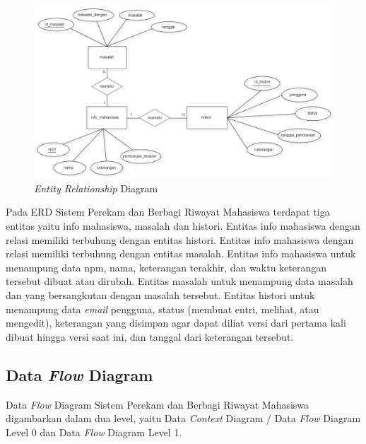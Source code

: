 \begin{figure}[ht]
\centering
\includegraphics[scale=0.4]{Gambar/ERD.png}
\caption[{\it Entity Relationship} Diagram]{{\it Entity Relationship} Diagram} 
\label{fig:erd}
\end{figure}

Pada ERD Sistem Perekam dan Berbagi Riwayat Mahasiswa terdapat tiga entitas yaitu info mahasiswa, masalah dan histori. Entitas info mahasiswa dengan relasi memiliki terbuhung dengan entitas histori. Entitas info mahasiswa dengan relasi memiliki terbuhung dengan entitas masalah. Entitas info mahasiswa untuk menampung data npm, nama, keterangan terakhir, dan waktu keterangan tersebut dibuat atau dirubah. Entitas masalah untuk menampung data masalah dan yang bersangkutan dengan masalah tersebut. Entitas histori untuk menampung data {\it email} pengguna, status (membuat entri, melihat, atau mengedit), keterangan yang disimpan agar dapat diliat versi dari pertama kali dibuat hingga versi saat ini, dan tanggal dari keterangan tersebut. 

\subsection{Data {\it Flow} Diagram}
Data {\it Flow} Diagram Sistem Perekam dan Berbagi Riwayat Mahasiswa digambarkan dalam dua level, yaitu Data {\it Context} Diagram / Data {\it Flow} Diagram Level 0 dan Data {\it Flow} Diagram Level 1.

